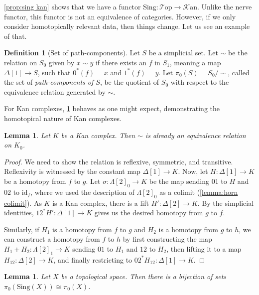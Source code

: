 \documentclass[11pt, a4paper]{amsart}
\newcommand{\Top}{\mathscr{T}\mathrm{op}}
\newcommand{\id}{\mathrm{id}}
\newcommand{\Sing}{\mathrm{Sing}}
\newcommand{\Kan}{\mathscr{K}\mathrm{an}}
\newtheorem{lemma}[equation]{Lemma}
\theoremstyle{definition}
\newtheorem{definition}[equation]{Definition}
\theoremstyle{remark}
\numberwithin{equation}{section}
\begin{document}
\cref{prop:sing kan} shows that we have a functor $\Sing\colon \Top \to \Kan$. Unlike the nerve functor, this functor is not an equivalence of categories. However, if we only consider homotopically relevant data, then things change. Let us see an example of that.

\begin{definition}[Set of path-components] \label{def:pizero sset}
  Let $S$ be a simplicial set. Let $\sim$ be the relation on $S_0$ given by $x \sim y$ if there exists an $f$ in $S_1$, meaning a map $\Delta[1] \to S$, such that $0^*(f) = x$ and $1^*(f) = y$. Let $\pi_0(S) = S_0/\sim$, called the set of \emph{path-components of $S$}, be the quotient of $S_0$ with respect to the equivalence relation generated by $\sim$.
\end{definition}

For Kan complexes, \cref{def:pizero sset} behaves as one might expect, demonstrating the homotopical nature of Kan complexes.

\begin{lemma} \label{lemma:homotopy equivalence relation}
 Let $K$ be a Kan complex. Then $\sim$ is already an equivalence relation on $K_0$.
\end{lemma}

\begin{proof}
  We need to show the relation is reflexive, symmetric, and transitive. Reflexivity is witnessed by the constant map $\Delta[1] \to K$. Now, let $H\colon\Delta[1] \to K$ be a homotopy from $f$ to $g$. Let $\sigma\colon \Lambda[2]_0 \to K$ be the map sending $01$ to $H$ and $02$ to $\id_{f}$, where we used the description of $\Lambda[2]_0$ as a colimit (\cref{lemma:horn colimit}). As $K$ is a Kan complex, there is a lift $H'\colon \Delta[2] \to K$. By the simplicial identities, $12^*H'\colon\Delta[1] \to K$ gives us the desired homotopy from $g$ to $f$.

  Similarly, if $H_1$ is a homotopy from $f$ to $g$ and $H_2$ is a homotopy from $g$ to $h$, we can construct a homotopy from $f$ to $h$ by first constructing the map $H_1 + H_2\colon \Lambda[2]_1 \to K$ sending $01$ to $H_1$ and $12$ to $H_2$, then lifting it to a map $H_{12}\colon \Delta[2] \to K$, and finally restricting to $02^*H_{12}\colon \Delta[1] \to K$.
\end{proof}

\begin{lemma} \label{lemma:sing pizero}
 Let $X$ be a topological space. Then there is a bijection of sets $\pi_0(\Sing(X)) \cong \pi_0(X)$.
\end{lemma}
\end{document}
